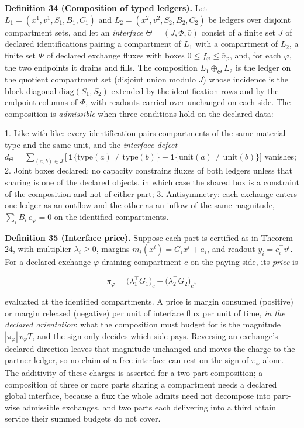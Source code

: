 \documentclass[11pt]{article}
\begin{document}
\textbf{Definition 34 (Composition of typed ledgers).} Let \(L_1 =\allowbreak{} (x^1,\allowbreak{} v^1,\allowbreak{} S_1,\allowbreak{} B_1,\allowbreak{} C_1)\) and \(L_2 =\allowbreak{} (x^2,\allowbreak{} v^2,\allowbreak{} S_2,\allowbreak{} B_2,\allowbreak{} C_2)\) be ledgers over disjoint compartment sets, and let an \emph{interface} \(\Theta = (J, \Phi, \bar v)\) consist of a finite set \(J\) of declared identifications pairing a compartment of \(L_1\) with a compartment of \(L_2\), a finite set \(\Phi\) of declared exchange fluxes with boxes \(0 \le f_\varphi \le \bar v_\varphi\), and, for each \(\varphi\), the two endpoints it drains and fills. The composition \(L_1 \oplus_\Theta L_2\) is the ledger on the quotient compartment set (disjoint union modulo \(J\)) whose incidence is the block-diagonal \(\mathrm{diag}(S_1, S_2)\) extended by the identification rows and by the endpoint columns of \(\Phi\), with readouts carried over unchanged on each side. The composition is \emph{admissible} when three conditions hold on the declared data:

1. Like with like: every identification pairs compartments of the same material type and the same unit, and the \emph{interface defect} \(d_\Theta =\allowbreak{} \sum_{(a,\allowbreak{}b) \in J} \bigl[\,\allowbreak{}\mathbf 1\{\mathrm{type}(a) \ne \mathrm{type}(b)\} +\allowbreak{} \mathbf 1\{\mathrm{unit}(a) \ne \mathrm{unit}(b)\}\bigr]\) vanishes; 2. Joint boxes declared: no capacity constrains fluxes of both ledgers unless that sharing is one of the declared objects, in which case the shared box is a constraint of the composition and not of either part; 3. Antisymmetry: each exchange enters one ledger as an outflow and the other as an inflow of the same magnitude, \(\textstyle\sum_{i} B_i\,\allowbreak{} e_\varphi =\allowbreak{} 0\) on the identified compartments.

\textbf{Definition 35 (Interface price).} Suppose each part is certified as in Theorem 24, with multiplier \(\lambda_i \ge 0\), margins \(m_i(x^i) = G_i x^i + a_i\), and readout \(y_i = c_i^{\top} v^i\). For a declared exchange \(\varphi\) draining compartment \(c\) on the paying side, its \emph{price} is 

$$\pi_\varphi = \bigl(\lambda_1^{\top} G_1\bigr)_c - \bigl(\lambda_2^{\top} G_2\bigr)_c ,$$

 evaluated at the identified compartments. A price is margin consumed (positive) or margin released (negative) per unit of interface flux per unit of time, \emph{in the declared orientation}: what the composition must budget for is the magnitude \(|\pi_\varphi|\,\allowbreak{}\bar v_\varphi T\), and the sign only decides which side pays. Reversing an exchange's declared direction leaves that magnitude unchanged and moves the charge to the partner ledger, so no claim of a free interface can rest on the sign of \(\pi_\varphi\) alone. The additivity of these charges is asserted for a two-part composition; a composition of three or more parts sharing a compartment needs a declared global interface, because a flux the whole admits need not decompose into part-wise admissible exchanges, and two parts each delivering into a third attain service their summed budgets do not cover.
\end{document}
